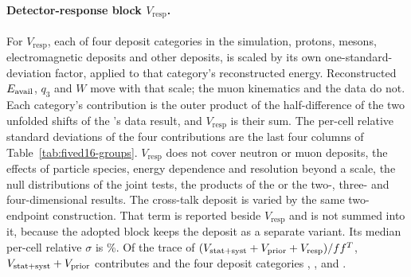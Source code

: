 \paragraph{Detector-response block $V_{\mathrm{resp}}$.} For $V_{\mathrm{resp}}$, each of four deposit categories in the simulation, protons, mesons, electromagnetic deposits and other deposits, is scaled by its own one-standard-deviation factor, applied to that category's reconstructed energy. Reconstructed $E_{\mathrm{avail}}$, $q_3$ and $W$ move with that scale; the muon kinematics and the data do not. Each category's contribution is the outer product of the half-difference of the two unfolded shifts of the \estMultiD{}'s data result, and $V_{\mathrm{resp}}$ is their sum. The per-cell relative standard deviations of the four contributions are the last four columns of Table~\ref{tab:fived16-groups}. $V_{\mathrm{resp}}$ does not cover neutron or muon deposits, the effects of particle species, energy dependence and resolution beyond a scale, the null distributions of the joint tests, the products of the \estPurity{} or the two-, three- and four-dimensional results. The cross-talk deposit is varied by the same two-endpoint construction. That term is reported beside $V_{\mathrm{resp}}$ and is not summed into it, because the adopted block keeps the deposit as a separate variant. Its median per-cell relative $\sigma$ is \%. Of the trace of $(V_{\mathrm{stat+syst}}+V_{\mathrm{prior}}+V_{\mathrm{resp}})/f f^{T}$, $V_{\mathrm{stat+syst}}+V_{\mathrm{prior}}$ contributes  and the four deposit categories , ,  and .


